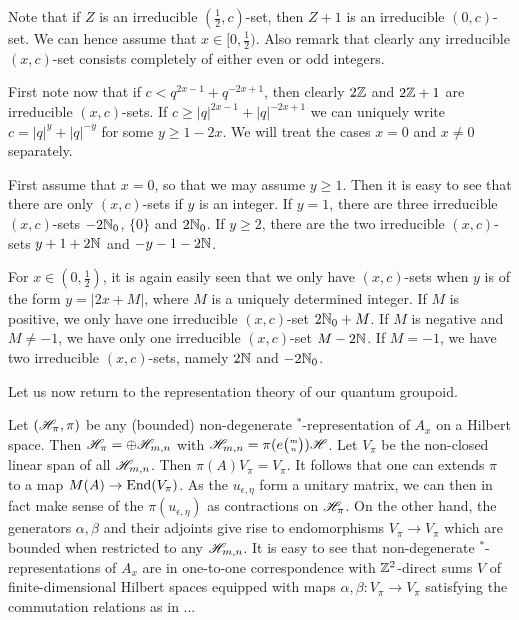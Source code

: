 Note that if $Z$ is an irreducible $(\frac{1}{2},c)$-set, then $Z+1$ is an irreducible $(0,c)$-set. We can hence assume that $x\in \lbrack 0,\frac{1}{2})$. Also remark that clearly any irreducible $(x,c)$-set consists completely of either even or odd integers. 

First note now that if $c< q^{2x-1}+q^{-2x+1}$, then clearly $2\mathbb{Z}$ and $2\mathbb{Z}+1$ are irreducible $(x,c)$-sets. If $c\geq |q|^{2x-1}+|q|^{-2x+1}$ we can uniquely write $c=|q|^y+|q|^{-y}$ for some $y\geq 1-2x$. We will treat the cases $x=0$ and $x\neq 0$ separately.

First assume that $x=0$, so that we may assume $y\geq 1$. Then it is easy to see that there are only $(x,c)$-sets if $y$ is an integer. If $y=1$,  there are three irreducible $(x,c)$-sets $-2\mathbb{N}_0$, $\{0\}$ and $2\mathbb{N}_0$. If $y\geq 2$,  there are the two irreducible $(x,c)$-sets $y+1+2\mathbb{N}$ and $-y-1-2\mathbb{N}$.

For $x\in (0,\frac{1}{2})$, it is again easily seen that we only have $(x,c)$-sets when $y$ is of the form $y=|2x+M|$, where $M$ is a uniquely determined integer. If $M$ is positive, we only have one irreducible $(x,c)$-set $2\mathbb{N}_0+M$. If $M$ is negative and $M\neq -1$, we have only one irreducible $(x,c)$-set  $M-2\mathbb{N}$. If $M=-1$, we have two irreducible $(x,c)$-sets, namely $2\mathbb{N}$ and $-2\mathbb{N}_0$.

Let us now return to the representation theory of our quantum groupoid.

Let $(\mathscr{H}_{\pi},\pi)$ be any (bounded) non-degenerate $^*$-representation of $A_x$ on a Hilbert space. Then $\mathscr{H}_{\pi} = \oplus \mathscr{H}_{m,n}$ with $\mathscr{H}_{m,n} = \pi(e{{\tiny \begin{pmatrix}m\\ n\end{pmatrix}}})\mathscr{H}$. Let $V_{\pi}$ be the non-closed linear span of all $\mathscr{H}_{m,n}$. Then $\pi(A)V_{\pi} = V_{\pi}$. It follows that one can extends $\pi$ to a map $M(A) \rightarrow \operatorname{\mathrm{End}}(V_{\pi})$. As the $u_{\epsilon,\eta}$ form a unitary matrix, we can then in fact make sense of the $\pi(u_{\epsilon,\eta})$ as contractions on $\mathscr{H}_{\pi}$. On the other hand, the generators $\alpha,\beta$ and their adjoints give rise to endomorphisms $V_{\pi}\rightarrow V_{\pi}$ which are bounded when restricted to any $\mathscr{H}_{m,n}$. It is easy to see that non-degenerate $^*$-representations of $A_x$ are in one-to-one correspondence with $\mathbb{Z}^2$-direct sums $V$ of finite-dimensional Hilbert spaces equipped with maps $\alpha,\beta:V_{\pi}\rightarrow V_{\pi}$ satisfying the commutation relations as in ...

